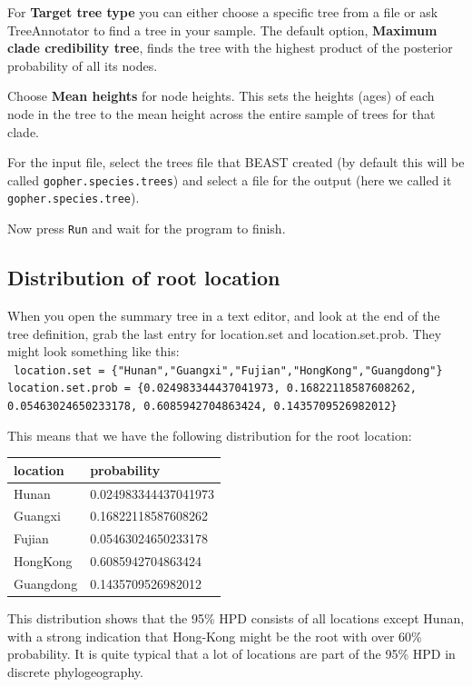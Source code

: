 \documentclass{article}
\begin{document}
For {\bf Target tree type} you can either choose a specific tree from a file or ask TreeAnnotator to find a tree in your sample. The default option, {\bf Maximum clade credibility tree}, finds the tree with the highest product of the posterior probability of all its nodes.

Choose {\bf Mean heights} for node heights. This sets the heights (ages) of each node in the tree to the mean height across the entire sample of trees for that clade.

For the input file, select the trees file that BEAST created (by default this will be called \texttt{gopher.species.trees}) and select a file for the output (here we called it \texttt{gopher.species.tree}).

Now press \texttt{Run} and wait for the program to finish.

\subsection*{Distribution of root location}

When you open the summary tree in a text editor, and look at the end of the tree definition, grab the last entry for location.set and location.set.prob. They might look something like this:
\\
{\tt
location.set = \{"Hunan","Guangxi","Fujian","HongKong","Guangdong"\}
location.set.prob = \{0.024983344437041973, 0.16822118587608262, 0.05463024650233178, 0.6085942704863424, 0.1435709526982012\}
}

This means that we have the following distribution for the root location:

\begin{tabular}{l|l}
\hline
location & probability\\
\hline
Hunan&0.024983344437041973\\
Guangxi&0.16822118587608262\\
Fujian&0.05463024650233178\\
HongKong&0.6085942704863424\\
Guangdong&0.1435709526982012\\
\hline
\end{tabular}

This distribution shows that the 95\% HPD consists of all locations except Hunan, with a 
strong indication that Hong-Kong might be the root with over 60\% probability. It is quite
typical that a lot of locations are part of the 95\% HPD in discrete phylogeography.
\end{document}
